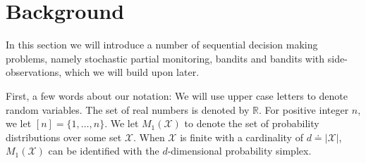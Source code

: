 \documentclass[11pt]{article} %
\newcommand{\R}{\mathbb{R}} %
\newcommand{\X}{\mathcal{X}}
\begin{document}

\section{Background}
\label{sec:background}
%

In this section we will introduce a number of sequential decision making problems,
namely stochastic partial monitoring, bandits and bandits with side-observations, which we will build upon later.

First, a few words about our notation: We will use upper case letters to denote random variables.
The set of real numbers is denoted by $\R$. For positive integer $n$, we let
$[n] = \{1,\dots,n\}$. %
We let $M_1(\X)$ to denote the set of probability distributions over some set $\X$.
When $\X$ is finite with a cardinality of $d \doteq |\X|$, 
$M_1(\X)$ can be identified with the $d$-dimensional probability simplex.
\end{document}
